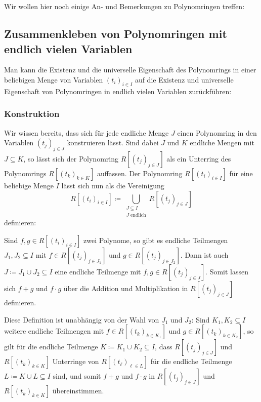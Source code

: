 \section{}

Wir wollen hier noch einige An- und Bemerkungen zu Polynomringen treffen:





\subsection*{Zusammenkleben von Polynomringen mit endlich vielen Variablen}

Man kann die Existenz und die universelle Eigenschaft des Polynomrings in einer beliebigen Menge von Variablen $(t_i)_{i \in I}$ auf die Existenz und universelle Eigenschaft von Polynomringen in endlich vielen Variablen zurückführen:



\subsubsection*{Konstruktion}

Wir wissen bereits, dass sich für jede endliche Menge $J$ einen Polynomring in den Variablen $(t_j)_{j \in J}$ konstruieren lässt.
Sind dabei $J$ und $K$ endliche Mengen mit $J \subseteq K$, so lässt sich der Polynomring $R[(t_j)_{j \in J}]$ als ein Unterring des Polynomrings $R[(t_k)_{k \in K}]$ auffassen.
Der Polynomring $R[(t_i)_{i \in I}]$ für eine beliebige Menge $I$ lässt sich nun als die Vereinigung
\[
            R[(t_i)_{i \in I}]
  \coloneqq \bigcup_{\substack{J \subseteq I \\ \text{$J$ endlich}}} R[(t_j)_{j \in J}]
\]
definieren:

Sind $f, g \in R[(t_i)_{i \in I}]$ zwei Polynome, so gibt es endliche Teilmengen $J_1, J_2 \subseteq I$ mit $f \in R[(t_j)_{j \in J_1}]$ und $g \in R[(t_j)_{j \in J_2}]$.
Dann ist auch $J \coloneqq J_1 \cup J_2 \subseteq I$ eine endliche Teilmenge mit $f, g \in R[(t_j)_{j \in J}]$.
Somit lassen sich $f + g$ und $f \cdot g$ über die Addition und Multiplikation in $R[(t_j)_{j \in J}]$ definieren.

Diese Definition ist unabhängig von der Wahl von $J_1$ und $J_2$:
Sind $K_1, K_2 \subseteq I$ weitere endliche Teilmengen mit $f \in R[(t_k)_{k \in K_1}]$ und $g \in R[(t_k)_{k \in K_2}]$, so gilt für die endliche Teilmenge $K \coloneqq K_1 \cup K_2 \subseteq I$, dass $R[(t_j)_{j \in J}]$ und $R[(t_k)_{k \in K}]$ Unterringe von $R[(t_\ell)_{\ell \in L}]$ für die endliche Teilmenge $L \coloneqq K \cup L \subseteq I$ sind, und somit $f + g$ und $f \cdot g$ in $R[(t_j)_{j \in J}]$ und $R[(t_k)_{k \in K}]$ übereinstimmen.

